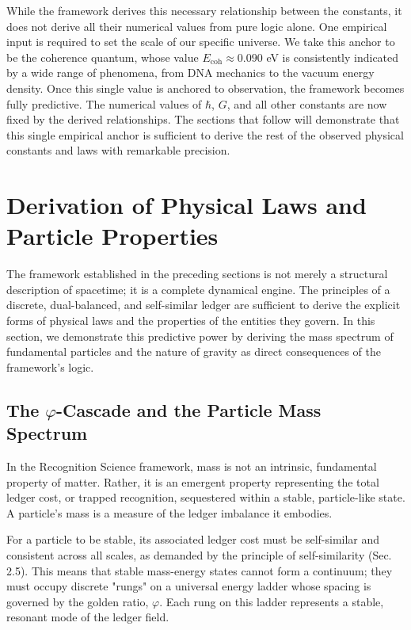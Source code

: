 \documentclass[11pt,a4paper]{article}
\begin{document}
While the framework derives this necessary relationship between the constants, it does not derive all their numerical values from pure logic alone. One empirical input is required to set the scale of our specific universe. We take this anchor to be the coherence quantum, whose value \(E_{\text{coh}} \approx 0.090\) eV is consistently indicated by a wide range of phenomena, from DNA mechanics to the vacuum energy density. Once this single value is anchored to observation, the framework becomes fully predictive. The numerical values of \(\hbar\), \(G\), and all other constants are now fixed by the derived relationships. The sections that follow will demonstrate that this single empirical anchor is sufficient to derive the rest of the observed physical constants and laws with remarkable precision.

\section{Derivation of Physical Laws and Particle Properties}

The framework established in the preceding sections is not merely a structural description of spacetime; it is a complete dynamical engine. The principles of a discrete, dual-balanced, and self-similar ledger are sufficient to derive the explicit forms of physical laws and the properties of the entities they govern. In this section, we demonstrate this predictive power by deriving the mass spectrum of fundamental particles and the nature of gravity as direct consequences of the framework's logic.

\subsection{The \texorpdfstring{$\varphi$}{phi}-Cascade and the Particle Mass Spectrum}
In the Recognition Science framework, mass is not an intrinsic, fundamental property of matter. Rather, it is an emergent property representing the total ledger cost, or trapped recognition, sequestered within a stable, particle-like state. A particle's mass is a measure of the ledger imbalance it embodies.

For a particle to be stable, its associated ledger cost must be self-similar and consistent across all scales, as demanded by the principle of self-similarity (Sec. 2.5). This means that stable mass-energy states cannot form a continuum; they must occupy discrete "rungs" on a universal energy ladder whose spacing is governed by the golden ratio, \(\varphi\). Each rung on this ladder represents a stable, resonant mode of the ledger field.
\end{document}
